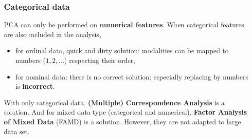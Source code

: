 \begin{frame}
\frametitle{Categorical data}
PCA can only be performed on {\bf numerical features}. When categorical features are also included in the analysis,
\begin{itemize}
\item for ordinal data, quick and dirty solution: modalities can be mapped to numbers ($1,2,\ldots$) respecting their order,
\item for nominal data: there is no correct solution; especially replacing by numbers is {\bf incorrect}.
\end{itemize}
With only categorical data, {\bf (Multiple) Correspondence Analysis} is a solution. And for mixed data type (categorical and numerical), {\bf Factor Analysis of Mixed Data} (FAMD) is a solution. However, they are not adapted to large data set.
\end{frame}
